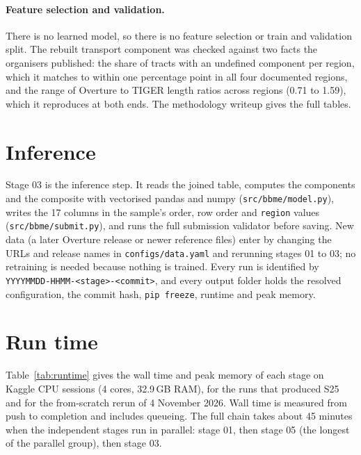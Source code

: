 \documentclass[11pt]{article}
\begin{document}
\paragraph{Feature selection and validation.} There is no learned model, so
there is no feature selection or train and validation split. The rebuilt
transport component was checked against two facts the organisers published:
the share of tracts with an undefined component per region, which it matches
to within one percentage point in all four documented regions, and the range
of Overture to TIGER length ratios across regions (0.71 to 1.59), which it
reproduces at both ends. The methodology writeup gives the full tables.

\section{Inference}

Stage 03 is the inference step. It reads the joined table, computes the
components and the composite with vectorised pandas and numpy
(\texttt{src/bbme/model.py}), writes the 17 columns in the sample's order,
row order and \texttt{region} values (\texttt{src/bbme/submit.py}), and runs
the full submission validator before saving. New data (a later Overture
release or newer reference files) enter by changing the URLs and release
names in \texttt{configs/data.yaml} and rerunning stages 01 to 03; no
retraining is needed because nothing is trained. Every run is identified by
\texttt{YYYYMMDD-HHMM-<stage>-<commit>}, and every output folder holds the
resolved configuration, the commit hash, \texttt{pip freeze}, runtime and
peak memory.

\section{Run time}
\label{sec:runtime}

Table~\ref{tab:runtime} gives the wall time and peak memory of each stage on
Kaggle CPU sessions (4 cores, 32.9\,GB RAM), for the runs that produced S25
and for the from-scratch rerun of 4 November 2026. Wall time is measured from
push to completion and includes queueing. The full chain takes about 45
minutes when the independent stages run in parallel: stage 01, then stage 05
(the longest of the parallel group), then stage 03.
\end{document}
